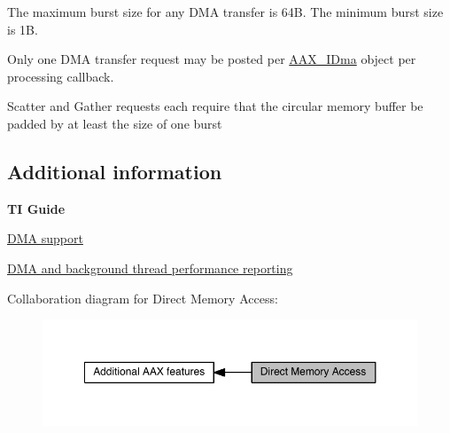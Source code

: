 \begin{DoxyItemize}
\item The maximum burst size for any D\+M\+A transfer is 64\+B. The minimum burst size is 1\+B. \item Only one D\+M\+A transfer request may be posted per \hyperlink{a00095}{A\+A\+X\+\_\+\+I\+Dma} object per processing callback. \item Scatter and Gather requests each require that the circular memory buffer be padded by at least the size of one burst\end{DoxyItemize}
\hypertarget{a00340_alg_dma_additionalinformation}{}\subsection{Additional information}\label{a00340_alg_dma_additionalinformation}
{\bfseries T\+I Guide} \begin{DoxyItemize}
\item \hyperlink{a00362_subsubsection__dma_support_}{D\+M\+A support} \item \hyperlink{a00362_subsubsection__dma_and_background_thread_performance_reporting_}{D\+M\+A and background thread performance reporting} \end{DoxyItemize}
Collaboration diagram for Direct Memory Access\+:
\nopagebreak
\begin{figure}[H]
\begin{center}
\leavevmode
\includegraphics[width=350pt]{a00340}
\end{center}
\end{figure}

